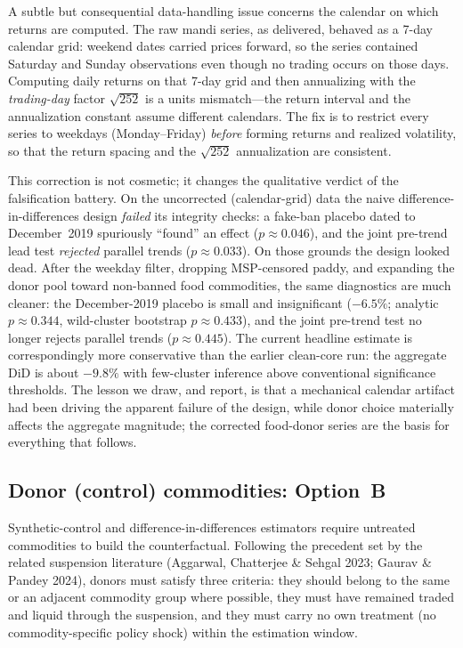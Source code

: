 A subtle but consequential data-handling issue concerns the calendar on which returns are computed.
The raw mandi series, as delivered, behaved as a 7-day calendar grid: weekend dates carried prices
forward, so the series contained Saturday and Sunday observations even though no trading occurs on
those days. Computing daily returns on that 7-day grid and then annualizing with the
\emph{trading-day} factor $\sqrt{252}$ is a units mismatch---the return interval and the
annualization constant assume different calendars. The fix is to restrict every series to weekdays
(Monday--Friday) \emph{before} forming returns and realized volatility, so that the return spacing
and the $\sqrt{252}$ annualization are consistent.

This correction is not cosmetic; it changes the qualitative verdict of the falsification battery.
On the uncorrected (calendar-grid) data the naive difference-in-differences design \emph{failed} its
integrity checks: a fake-ban placebo dated to December~2019 spuriously ``found'' an effect
($p \approx 0.046$), and the joint pre-trend lead test \emph{rejected} parallel trends
($p \approx 0.033$). On those grounds the design looked dead. After the weekday filter, dropping
MSP-censored paddy, and expanding the donor pool toward non-banned food commodities, the same
diagnostics are much cleaner: the December-2019 placebo is small and insignificant
($-6.5\%$; analytic $p \approx 0.344$, wild-cluster bootstrap $p \approx 0.433$), and the joint
pre-trend test no longer rejects parallel trends ($p \approx 0.445$). The current headline estimate
is correspondingly more conservative than the earlier clean-core run: the aggregate DiD is about
$-9.8\%$ with few-cluster inference above conventional significance thresholds. The lesson we draw,
and report, is that a mechanical calendar artifact had been driving the apparent failure of the
design, while donor choice materially affects the aggregate magnitude; the corrected food-donor
series are the basis for everything that follows.

\subsection{Donor (control) commodities: Option~B}

Synthetic-control and difference-in-differences estimators require untreated commodities to build the
counterfactual. Following the precedent set by the related suspension literature (Aggarwal,
Chatterjee \& Sehgal 2023; Gaurav \& Pandey 2024), donors must satisfy three criteria: they should
belong to the same or an adjacent commodity group where possible, they must have remained traded and
liquid through the suspension, and they must carry no own treatment (no commodity-specific policy
shock) within the estimation window.

